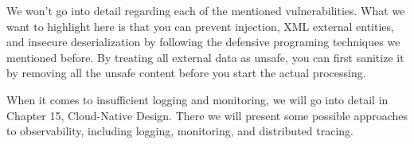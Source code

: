 We won't go into detail regarding each of the mentioned vulnerabilities. What we want to highlight here is that you can prevent injection, XML external entities, and insecure deserialization by following the defensive programing techniques we mentioned before. By treating all external data as unsafe, you can first sanitize it by removing all the unsafe content before you start the actual processing.

When it comes to insufficient logging and monitoring, we will go into detail in Chapter 15, Cloud-Native Design. There we will present some possible approaches to observability, including logging, monitoring, and distributed tracing.

















